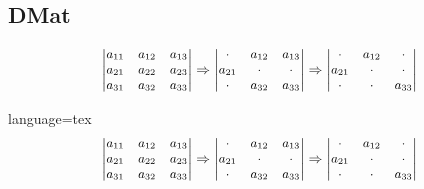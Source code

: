 \documentclass[../main]{subfiles}
\begin{document}
\subsection{DMat}

\[
    \DMat{a_{11}&a_{12}&a_{13}\\a_{21}&a_{22}&a_{23}\\a_{31}&a_{32}&a_{33}} \Rightarrow
    \DMat{\cdot&a_{12}&a_{13}\\a_{21}&\cdot&\cdot\\\cdot&a_{32}&a_{33}} \Rightarrow
    \DMat{\cdot&a_{12}&\cdot\\a_{21}&\cdot&\cdot\\\cdot&\cdot&a_{33}}
\]
\begin{Code}{language=tex}
\[
    \DMat{a_{11}&a_{12}&a_{13}\\a_{21}&a_{22}&a_{23}\\a_{31}&a_{32}&a_{33}} \Rightarrow
    \DMat{\cdot&a_{12}&a_{13}\\a_{21}&\cdot&\cdot\\\cdot&a_{32}&a_{33}} \Rightarrow
    \DMat{\cdot&a_{12}&\cdot\\a_{21}&\cdot&\cdot\\\cdot&\cdot&a_{33}}
\]
\end{Code}

\end{document}
